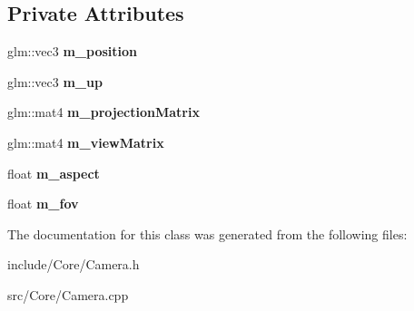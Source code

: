 \subsection*{Private Attributes}
\begin{DoxyCompactItemize}
\item 
\hypertarget{class_camera_aa4d06d49524248f81823444fa2544da0}{glm\-::vec3 {\bfseries m\-\_\-position}}\label{class_camera_aa4d06d49524248f81823444fa2544da0}

\item 
\hypertarget{class_camera_af2a8632b36b3c7b1a79234ab4ccf4059}{glm\-::vec3 {\bfseries m\-\_\-up}}\label{class_camera_af2a8632b36b3c7b1a79234ab4ccf4059}

\item 
\hypertarget{class_camera_a26d7567bf34d14260f887a0382aeae29}{glm\-::mat4 {\bfseries m\-\_\-projection\-Matrix}}\label{class_camera_a26d7567bf34d14260f887a0382aeae29}

\item 
\hypertarget{class_camera_a11c9caa79662eca069eda13481913a25}{glm\-::mat4 {\bfseries m\-\_\-view\-Matrix}}\label{class_camera_a11c9caa79662eca069eda13481913a25}

\item 
\hypertarget{class_camera_abf58e1558e08e785c929f41b25615c30}{float {\bfseries m\-\_\-aspect}}\label{class_camera_abf58e1558e08e785c929f41b25615c30}

\item 
\hypertarget{class_camera_aa404a4e057fa16fb82ce8668d7a661b6}{float {\bfseries m\-\_\-fov}}\label{class_camera_aa404a4e057fa16fb82ce8668d7a661b6}

\end{DoxyCompactItemize}


The documentation for this class was generated from the following files\-:\begin{DoxyCompactItemize}
\item 
include/\-Core/Camera.\-h\item 
src/\-Core/Camera.\-cpp\end{DoxyCompactItemize}
